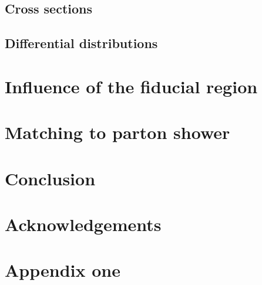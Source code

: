 \documentclass[11pt,epsf]{article}
\begin{document}
\subsection{Cross sections}



\subsection{Differential distributions}



\section{Influence of the fiducial region}

\section{Matching to parton shower}



\section{Conclusion}



\section*{Acknowledgements}



\appendix

\section{Appendix one}




\end{document}
